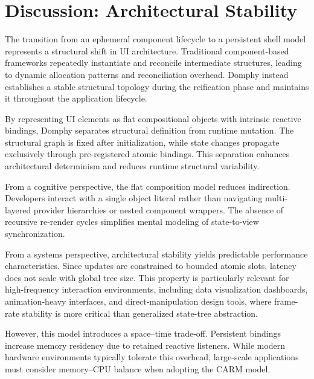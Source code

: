\section{Discussion: Architectural Stability}

The transition from an ephemeral component lifecycle to a persistent shell model
represents a structural shift in UI architecture. Traditional component-based
frameworks repeatedly instantiate and reconcile intermediate structures,
leading to dynamic allocation patterns and reconciliation overhead. 
Domphy instead establishes a stable structural topology during the
reification phase and maintains it throughout the application lifecycle.

By representing UI elements as flat compositional objects with intrinsic
reactive bindings, Domphy separates structural definition from runtime
mutation. The structural graph is fixed after initialization, while
state changes propagate exclusively through pre-registered atomic bindings.
This separation enhances architectural determinism and reduces runtime
structural variability.

From a cognitive perspective, the flat composition model reduces indirection.
Developers interact with a single object literal rather than navigating
multi-layered provider hierarchies or nested component wrappers.
The absence of recursive re-render cycles simplifies mental modeling of
state-to-view synchronization.

From a systems perspective, architectural stability yields predictable
performance characteristics. Since updates are constrained to bounded
atomic slots, latency does not scale with global tree size. This property
is particularly relevant for high-frequency interaction environments,
including data visualization dashboards, animation-heavy interfaces,
and direct-manipulation design tools, where frame-rate stability is
more critical than generalized state-tree abstraction.

However, this model introduces a space–time trade-off. Persistent bindings
increase memory residency due to retained reactive listeners.
While modern hardware environments typically tolerate this overhead,
large-scale applications must consider memory–CPU balance when adopting
the CARM model.

